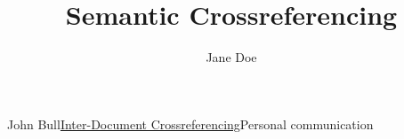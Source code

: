 \documentclass[extrefs]{omdoc}
\title{Semantic Crossreferencing}
\author{Jane Doe}
\begin{document}
 
\maketitle

\begin{thebibliography}{IDC}
John Bull\newblock \href{scr.pdf}{Inter-Document Crossreferencing}\newblock Personal communication
\end{thebibliography}
\end{document}

